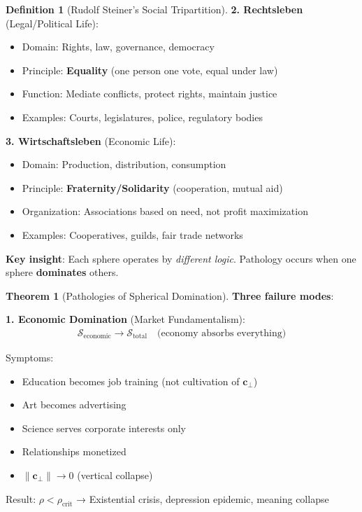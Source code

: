 \documentclass[11pt,a4paper]{article}
\theoremstyle{definition}
\newtheorem{definition}{Definition}[section]
\newtheorem{theorem}{Theorem}[section]
\theoremstyle{remark}
\newcommand{\cc}{\mathbf{c}}
\begin{document}
\begin{small}
\begin{enumerate}
\begin{definition}[Rudolf Steiner's Social Tripartition]
\textbf{2. Rechtsleben} (Legal/Political Life):
\begin{itemize}
    \item Domain: Rights, law, governance, democracy
    \item Principle: \textbf{Equality} (one person one vote, equal under law)
    \item Function: Mediate conflicts, protect rights, maintain justice
    \item Examples: Courts, legislatures, police, regulatory bodies
\end{itemize}

\textbf{3. Wirtschaftsleben} (Economic Life):
\begin{itemize}
    \item Domain: Production, distribution, consumption
    \item Principle: \textbf{Fraternity/Solidarity} (cooperation, mutual aid)
    \item Organization: Associations based on need, not profit maximization
    \item Examples: Cooperatives, guilds, fair trade networks
\end{itemize}

\textbf{Key insight}: Each sphere operates by \textit{different logic}. Pathology occurs when one sphere \textbf{dominates} others.
\end{definition}

\begin{theorem}[Pathologies of Spherical Domination]
\textbf{Three failure modes}:

\textbf{1. Economic Domination} (Market Fundamentalism):
\begin{align}
\mathcal{S}_{\text{economic}} \to \mathcal{S}_{\text{total}} \quad \text{(economy absorbs everything)}
\end{align}

Symptoms:
\begin{itemize}
    \item Education becomes job training (not cultivation of \(\cc_\perp\))
    \item Art becomes advertising
    \item Science serves corporate interests only
    \item Relationships monetized
    \item \(\|\cc_\perp\| \to 0\) (vertical collapse)
\end{itemize}

Result: \(\rho < \rho_{\text{crit}}\) → Existential crisis, depression epidemic, meaning collapse


\end{theorem}
\end{enumerate}
\end{small}
\end{document}
